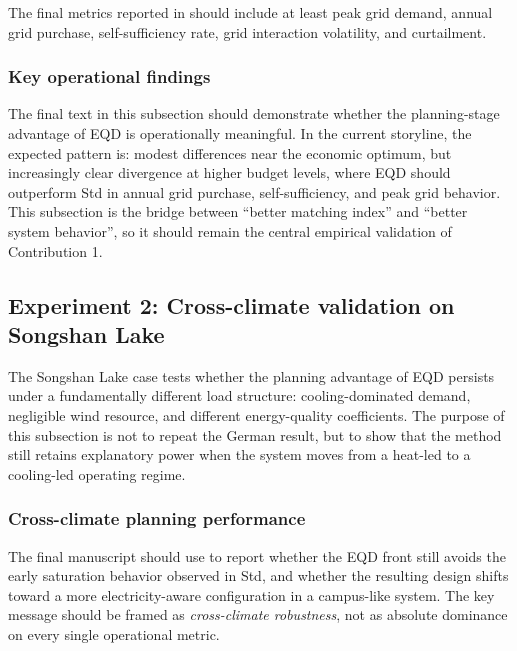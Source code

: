The final metrics reported in  should include at least peak grid demand, annual grid purchase, self-sufficiency rate, grid interaction volatility, and curtailment.

\subsubsection{Key operational findings}

The final text in this subsection should demonstrate whether the planning-stage advantage of EQD is operationally meaningful. In the current storyline, the expected pattern is: modest differences near the economic optimum, but increasingly clear divergence at higher budget levels, where EQD should outperform Std in annual grid purchase, self-sufficiency, and peak grid behavior. This subsection is the bridge between ``better matching index'' and ``better system behavior'', so it should remain the central empirical validation of Contribution 1.


\subsection{Experiment 2: Cross-climate validation on Songshan Lake}
\label{sec:exp2}

The Songshan Lake case tests whether the planning advantage of EQD persists under a fundamentally different load structure: cooling-dominated demand, negligible wind resource, and different energy-quality coefficients. The purpose of this subsection is not to repeat the German result, but to show that the method still retains explanatory power when the system moves from a heat-led to a cooling-led operating regime.

\subsubsection{Cross-climate planning performance}

The final manuscript should use  to report whether the EQD front still avoids the early saturation behavior observed in Std, and whether the resulting design shifts toward a more electricity-aware configuration in a campus-like system. The key message should be framed as \emph{cross-climate robustness}, not as absolute dominance on every single operational metric.

